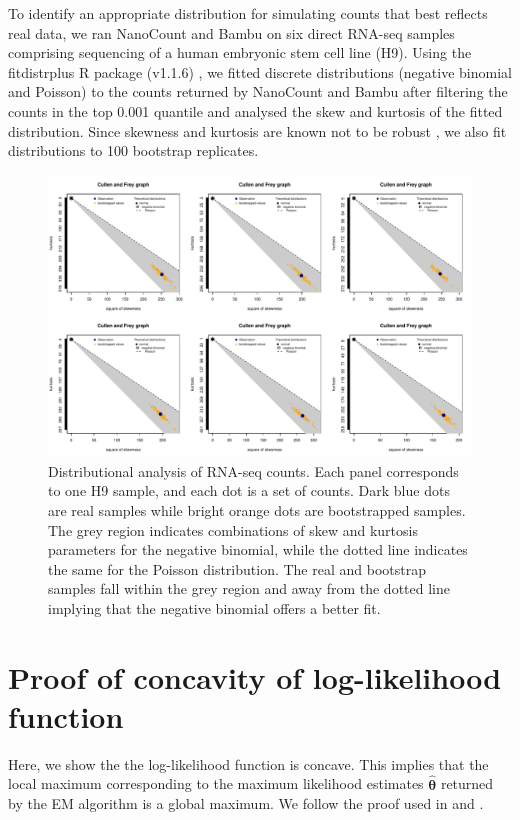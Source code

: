 To identify an appropriate distribution for simulating counts that best reflects real data, we ran NanoCount and Bambu on six direct RNA-seq samples comprising sequencing of a human embryonic stem cell line (H9). Using the fitdistrplus R package (v1.1.6) \cite{Delignette-Muller2015}, we fitted discrete distributions (negative binomial and Poisson) to the counts returned by NanoCount and Bambu after filtering the counts in the top 0.001 quantile and analysed the skew and kurtosis of the fitted distribution. Since skewness and kurtosis are known not to be robust \cite{Delignette-Muller2015}, we also fit distributions to 100 bootstrap replicates. 
\begin{figure}
    \centering
    \includegraphics[width=\textwidth]{figures/ap-c.pdf}
    \caption[Distributional analysis of RNA-seq counts]{Distributional analysis of RNA-seq counts. Each panel corresponds to one H9 sample, and each dot is a set of counts. Dark blue dots are real samples while bright orange dots are bootstrapped samples. The grey region indicates combinations of skew and kurtosis parameters for the negative binomial, while the dotted line indicates the same for the Poisson distribution. The real and bootstrap samples fall within the grey region and away from the dotted line implying that the negative binomial offers a better fit.}
    \label{fig:my_label}
\end{figure}

\chapter{Proof of concavity of log-likelihood function}\label{sec:proof-log-lik}

Here, we show the the log-likelihood function is concave. This implies that the local maximum corresponding to the maximum likelihood estimates $\hat{\bm\theta}$ returned by the EM algorithm is a global maximum. We follow the proof used in \cite{Jiang2009} and \cite{Libo2009}.  

